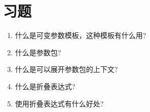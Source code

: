 \section{习题}
\begin{enumerate}
\item
什么是可变参数模板，这种模板有什么用?

\item
什么是参数包?

\item
什么是可以展开参数包的上下文?

\item
什么是折叠表达式?

\item
使用折叠表达式有什么好处?
\end{enumerate}